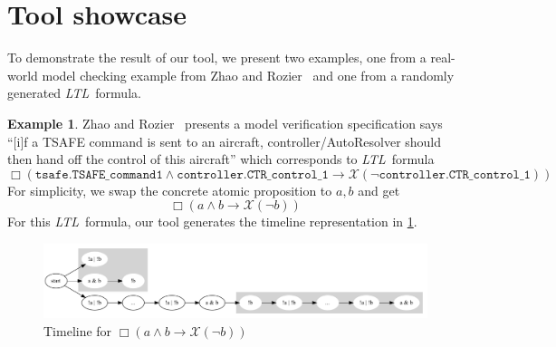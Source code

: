 \documentclass[preprint,12pt]{elsarticle}
\theoremstyle{definition}
\newtheorem{example}{Example}[section]
\theoremstyle{remark}
\newcommand{\always}{\Box}
\newcommand{\nextt}{\mathcal{X}}
\newcommand{\limplies}{\rightarrow}
\newcommand{\ltl}{\textit{LTL}}
\begin{document}
\section{Tool showcase}
To demonstrate the result of our tool, we present two examples, one from a real-world model checking example from Zhao and Rozier~\cite{ZR14} and one from a randomly generated \ltl\ formula.

\begin{example}
    Zhao and Rozier~\cite{ZR14} presents a model verification specification says ``[i]f a TSAFE command is sent to an aircraft, controller/AutoResolver should then hand off the control of this aircraft'' which corresponds to \ltl\ formula
    \[
        \always (\texttt{tsafe.TSAFE\_command1} \land \texttt{controller.CTR\_control\_1} \limplies \nextt (\neg \texttt{controller.CTR\_control\_1}))
    \]
    For simplicity, we swap the concrete atomic proposition to $a,b$ and get
    \[
        \always (a \land b \limplies \nextt (\neg b))
    \]
    For this \ltl\ formula, our tool generates the timeline representation in \cref{fig:ex14}.
    \begin{figure}[h!]
        \centering
        \includegraphics[scale=0.3]{examples/ex14/ex14.png}
        \caption{Timeline for $\always (a \land b \limplies \nextt (\neg b))$}
        \label{fig:ex14}
    \end{figure}
\end{example}
\end{document}
